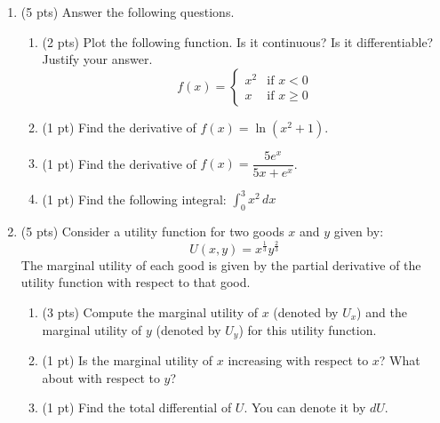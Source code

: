\documentclass{./../../latex/tests}
\begin{document}
\thispagestyle{plain}
\vspace{0.5em}

\begin{enumerate}

\item (5 pts) Answer the following questions.
\begin{enumerate}
\item (2 pts) Plot the following function. Is it continuous? Is it differentiable? Justify your answer.
\[ f(x) = \begin{cases} x^2 & \text{if } x < 0 \\ x & \text{if } x \geq 0 \end{cases} \]
\vspace{6.5cm}
\item (1 pt) Find the derivative of $f(x) = \ln(x^2 + 1)$.
\vspace{3cm}
\item (1 pt) Find the derivative of $f(x) = \dfrac{5e^x}{5x+e^x}$.
\vspace{3.5cm}
\item (1 pt) Find the following integral: $\displaystyle \int_0^3 x^2 \, dx$
\end{enumerate}

\newpage
\item (5 pts) Consider a utility function for two goods $x$ and $y$ given by:
\[ U(x, y) = x^{\frac{1}{3}} y^{\frac{2}{3}} \]
The marginal utility of each good is given by the partial derivative of the utility function with respect to that good.
\begin{enumerate}
\item (3 pts) Compute the marginal utility of $x$ (denoted by $U_x$) and the marginal utility of $y$ (denoted by $U_y$) for this utility function.
\vspace{7cm}
\item (1 pt) Is the marginal utility of $x$ increasing with respect to $x$? What about with respect to $y$?
\vspace{5cm}
\item (1 pt) Find the total differential of $U$. You can denote it by $dU$.
\end{enumerate}


\end{enumerate}
\end{document}
